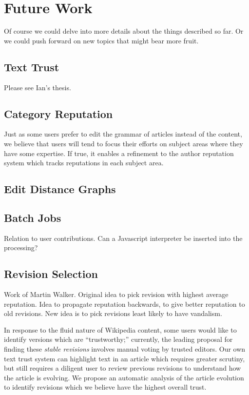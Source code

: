 \section{Future Work}

Of course we could delve into more details about
the things described so far.  Or we could push forward
on new topics that might bear more fruit.

\subsection{Text Trust}

Please see Ian's thesis.

\subsection{Category Reputation}

Just as some users prefer to edit the grammar of
articles instead of the content, we believe that
users will tend to focus their efforts on subject
areas where they have some expertise.
If true, it enables a refinement to the author
reputation system which tracks reputations in
each subject area.


\subsection{Edit Distance Graphs}

\subsection{Batch Jobs}

    Relation to user contributions.
    Can a Javascript interpreter be inserted into the processing?

\subsection{Revision Selection}

    Work of Martin Walker.
    Original idea to pick revision with highest average reputation.
    Idea to propagate reputation backwards, to give better reputation
    to old revisions.
    New idea is to pick revisions least likely to have vandalism.

   In response to the fluid nature of Wikipedia content,
    some users would like to identify versions which
    are ``trustworthy;'' currently, the leading proposal
    for finding these \textit{stable revisions}
    involves manual voting by trusted editors.
    Our own text trust system can highlight text in
    an article which requires greater scrutiny, but
    still requires a diligent user to review previous
    revisions to understand how the article is evolving.
    We propose an automatic analysis of the article evolution
    to identify revisions which we believe
    have the highest overall trust.

